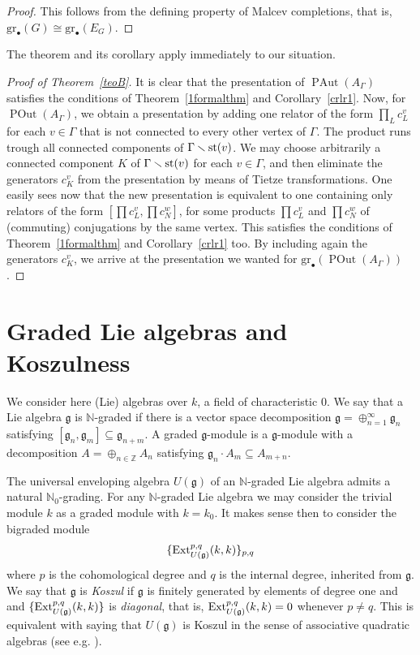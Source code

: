 \documentclass[10pt]{amsart}
\theoremstyle{definition}
\newcommand{\Ext}{{\rm Ext}}
\newcommand{\st}{{\rm st}}
\newcommand{\Z}{\mathbb Z}
\newcommand{\N}{\mathbb N}
\newcommand{\PAut}{\operatorname{PAut}}
\newcommand{\POut}{\operatorname {POut}}
\newcommand{\g}{\mathfrak{g}}
\newcommand{\gr}{\mathrm{gr}_\bullet}
\theoremstyle{definition}
\numberwithin{equation}{section}
\begin{document}
\begin{proof}
 This follows from the defining property of Malcev completions, that is, $\gr(G) \cong \gr(E_G)$.
\end{proof}

The theorem and its corollary apply immediately to our situation.
\begin{proof}[Proof of Theorem~\ref{teoB}]
  It is clear that the presentation of $\PAut(A_\Gamma)$ satisfies the conditions of Theorem~\ref{1formalthm} and Corollary~\ref{crlr1}.  Now, for $\POut(A_{\Gamma})$, we obtain a presentation by adding one relator of the form $\prod_L c_L^v$ for each $v \in \Gamma$ that is not connected to every other vertex of $\Gamma$. The product runs trough all connected components of
$\Gamma \smallsetminus \st(v)$. We may choose arbitrarily a connected component $K$ of $\Gamma \smallsetminus \st(v)$ for each
$v \in \Gamma$, and then eliminate the generators $c_K^v$ from the presentation by means of Tietze transformations. One easily sees now that the new presentation is equivalent to one containing only relators of the form $[\prod c_L^v , \prod c_N^w]$, for some products $\prod c_L^v$ and $\prod c_N^w$ of (commuting) conjugations by the same vertex.
This satisfies the conditions of Theorem~\ref{1formalthm} and Corollary~\ref{crlr1} too. By including again the generators $c_K^v$, we arrive at the presentation we wanted for $\gr(\POut(A_\Gamma))$.
 \end{proof}



 \section{Graded Lie algebras and Koszulness}
We consider here (Lie) algebras over $k$, a field of characteristic $0$. We say that a Lie algebra $\g$ is $\N$-graded if there is a vector space decomposition $\g = \oplus_{n=1}^\infty \g_n$ satisfying $[\g_n,\g_m] \subseteq \g_{n+m}$. A graded $\g$-module is a $\g$-module with a decomposition $A = \oplus_{n \in \Z} A_n$ satisfying $\g_n \cdot A_m \subseteq A_{m+n}$.

The universal enveloping algebra $U(\g)$ of an $\N$-graded Lie algebra admits a natural $\N_0$-grading. For any $\N$-graded Lie algebra we may consider the trivial module $k$ as a graded module with $k = k_0$. It makes sense then to consider the bigraded module
\[ \{\Ext_{U(\g)}^{p,q}(k,k)\}_{p,q}\]
where $p$ is the cohomological degree and $q$ is the internal degree, inherited from $\g$. We say that $\g$ is \emph{Koszul} if $\g$ is finitely generated by elements of degree one and and $\{\Ext_{U(\g)}^{p,q}(k,k)\}$ is \emph{diagonal}, that is, $\Ext_{U(\g)}^{p,q}(k,k) = 0$ whenever $p\neq q$. This is equivalent with saying that $U(\g)$ is Koszul in the sense of associative quadratic algebras (see e.g. \cite{Quadratic}).
\end{document}
